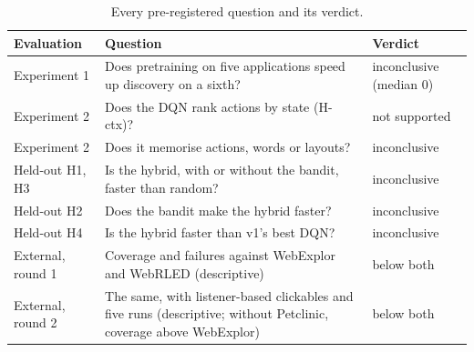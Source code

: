 \begin{table}[H]
\centering
\small
\caption{Every pre-registered question and its verdict.}
\label{tab:prereg-summary}
\begin{tabularx}{\textwidth}{@{}l X l@{}}
\toprule
Evaluation & Question & Verdict \\
\midrule
Experiment 1 & Does pretraining on five applications speed up discovery on a sixth? & inconclusive (median 0) \\
Experiment 2 & Does the DQN rank actions by state (H-ctx)? & not supported \\
Experiment 2 & Does it memorise actions, words or layouts? & inconclusive \\
Held-out H1, H3 & Is the hybrid, with or without the bandit, faster than random? & inconclusive \\
Held-out H2 & Does the bandit make the hybrid faster? & inconclusive \\
Held-out H4 & Is the hybrid faster than v1's best DQN? & inconclusive \\
External, round 1 & Coverage and failures against WebExplor and WebRLED (descriptive) & below both \\
External, round 2 & The same, with listener-based clickables and five runs (descriptive; without Petclinic, coverage above WebExplor) & below both \\
\bottomrule
\end{tabularx}
\end{table}


